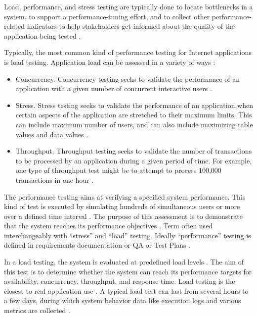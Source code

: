 \documentclass[espaco=umemeio,chapter=TITLE,twoside,openright]{abnt}
\begin{document}
Load, performance, and stress testing are typically done to locate bottlenecks in a system, to support a performance-tuning effort, and to collect other performance-related indicators to help stakeholders get informed about the quality of the application being tested \cite{Sandler2004} \cite{Corporation2007}.

Typically, the most common kind of performance testing for Internet applications is load testing. Application load can be assessed in a variety of ways \cite{Perry2004}:

\begin{itemize}
\item Concurrency. Concurrency testing seeks to validate the performance of an application with a given number of concurrent interactive users \cite{Perry2004}.
\item Stress. Stress testing seeks to validate the performance of an application when certain aspects of the application are stretched to their maximum limits. This can include maximum number of users, and can also include maximizing table values and data values \cite{Perry2004}.
\item Throughput. Throughput testing seeks to validate the number of transactions to be processed by an application during a given period of time. For example, one type of throughput test might be to attempt to process 100,000 transactions in one hour \cite{Perry2004}.
\end{itemize}


The performance testing aims at verifying a specified system performance. This kind of test is executed by simulating hundreds of simultaneous users or more over a defined time interval \cite{DiLucca2006}. The purpose of this assessment is to demonstrate that the system reaches its performance objectives \cite{Sandler2004}.  Term often used interchangeably with “stress” and “load” testing. Ideally “performance” testing is defined in requirements documentation or QA or Test Plans \cite{Lewis2005}.


In a load testing, the system is evaluated at predefined load levels \cite{DiLucca2006}. The aim of this test is to determine whether the system can reach its performance targets for availability, concurrency, throughput, and response time. Load testing is the closest to real application use \cite{Molyneaux2009}. A typical load test can last from several hours to a few days, during which system behavior data like execution logs and various metrics are collected \cite{Afzal2009a}.
\end{document}
